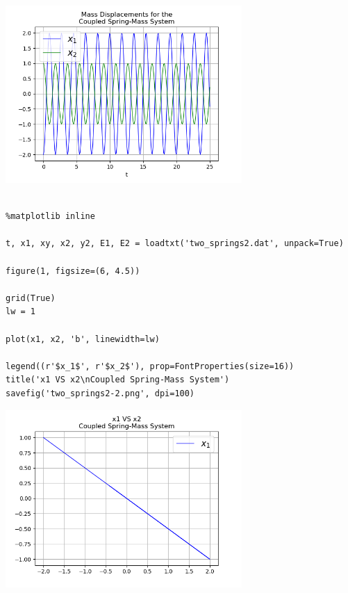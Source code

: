 \documentclass{article} %
\begin{document}
\begin{center}
 	\includegraphics[width=9cm]{two_springs2-1.png}
 \end{center}





\begin{verbatim} 

%matplotlib inline

t, x1, xy, x2, y2, E1, E2 = loadtxt('two_springs2.dat', unpack=True)

figure(1, figsize=(6, 4.5))

grid(True)
lw = 1

plot(x1, x2, 'b', linewidth=lw)

legend((r'$x_1$', r'$x_2$'), prop=FontProperties(size=16))
title('x1 VS x2\nCoupled Spring-Mass System')
savefig('two_springs2-2.png', dpi=100)

\end{verbatim}


\begin{center}
 	\includegraphics[width=9cm]{two_springs2-2.png}
 \end{center}
\end{document}
